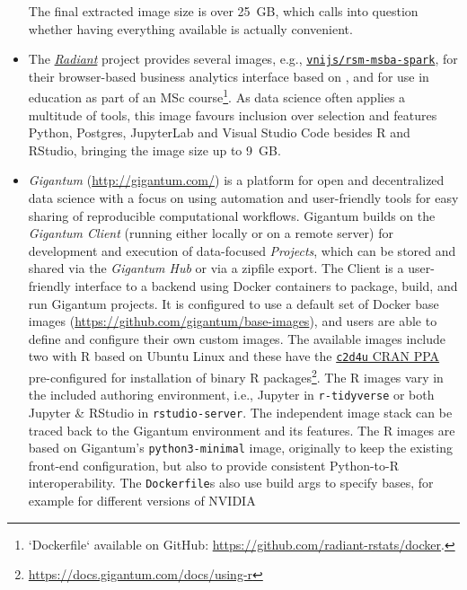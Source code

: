 \begin{itemize}
  The final extracted image size is over 25~GB, which calls into
  question whether having everything available is actually convenient.
\item
  The \href{https://radiant-rstats.github.io/docs/}{\emph{Radiant}}
  project provides several images, e.g.,
  \href{https://hub.docker.com/r/vnijs/rsm-msba-spark}{\texttt{vnijs/rsm-msba-spark}},
  for their browser-based business analytics interface based on
   \citep{cran_shiny}, and for use in education as part
  of an MSc
  course\footnote{`Dockerfile` available on GitHub: \href{https://github.com/radiant-rstats/docker}{https://github.com/radiant-rstats/docker}.}.
  As data science often applies a multitude of tools, this image favours
  inclusion over selection and features Python, Postgres, JupyterLab and
  Visual Studio Code besides R and RStudio, bringing the image size up
  to 9~GB.
\item
  \emph{Gigantum} (\url{http://gigantum.com/}) is a platform for open
  and decentralized data science with a focus on using automation and
  user-friendly tools for easy sharing of reproducible computational
  workflows. Gigantum builds on the \emph{Gigantum Client} (running
  either locally or on a remote server) for development and execution of
  data-focused \emph{Projects}, which can be stored and shared via the
  \emph{Gigantum Hub} or via a zipfile export. The Client is a
  user-friendly interface to a backend using Docker containers to
  package, build, and run Gigantum projects. It is configured to use a
  default set of Docker base images
  (\url{https://github.com/gigantum/base-images}), and users are able to
  define and configure their own custom images. The available images
  include two with R based on Ubuntu Linux and these have the
  \href{https://launchpad.net/~marutter/+archive/ubuntu/c2d4u3.5/}{\texttt{c2d4u}
  CRAN PPA} pre-configured for installation of binary R
  packages\footnote{\href{https://docs.gigantum.com/docs/using-r}{https://docs.gigantum.com/docs/using-r}}.
  The R images vary in the included authoring environment, i.e., Jupyter
  in \texttt{r-tidyverse} or both Jupyter \& RStudio in
  \texttt{rstudio-server}. The independent image stack can be traced
  back to the Gigantum environment and its features. The R images are
  based on Gigantum's \texttt{python3-minimal} image, originally to keep
  the existing front-end configuration, but also to provide consistent
  Python-to-R interoperability. The \texttt{Dockerfile}s also use build
  args to specify bases, for example for different versions of NVIDIA

\end{itemize}
